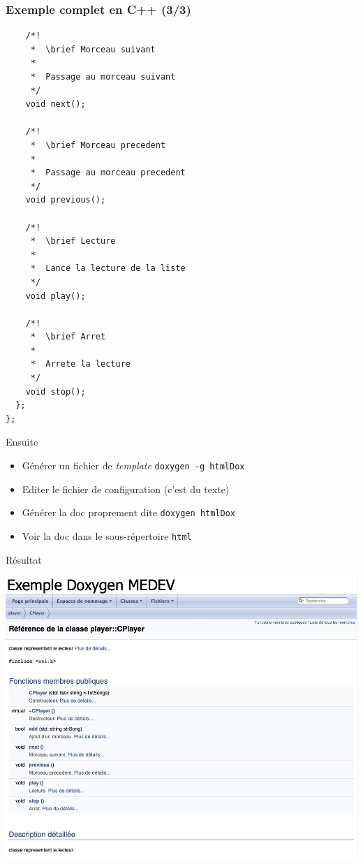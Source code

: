 \begin{frame}[fragile]
\frametitle{Exemple complet en C++ (3/3)}
\begin{lstlisting}
    /*!
     *  \brief Morceau suivant
     *
     *  Passage au morceau suivant
     */
    void next();
 
    /*!
     *  \brief Morceau precedent
     *
     *  Passage au morceau precedent
     */
    void previous();
 
    /*!
     *  \brief Lecture 
     *
     *  Lance la lecture de la liste
     */
    void play();
 
    /*!
     *  \brief Arret
     *
     *  Arrete la lecture
     */
    void stop();
  };
};
\end{lstlisting}
\end{frame}

\begin{frame}{Ensuite}
\begin{itemize}
\item Générer un fichier de \textit{template}
\texttt{doxygen -g htmlDox}
\item Editer le fichier de configuration (c'est du texte)
\item Générer la doc proprement dite 
\texttt{doxygen htmlDox}
\item Voir la doc dans le sous-répertoire \texttt{html}
\end{itemize}
\end{frame}

\begin{frame}{Résultat}
\begin{center}
\includegraphics[height=\textheight]{fig/doxygen.jpg}
\end{center}
\end{frame}
